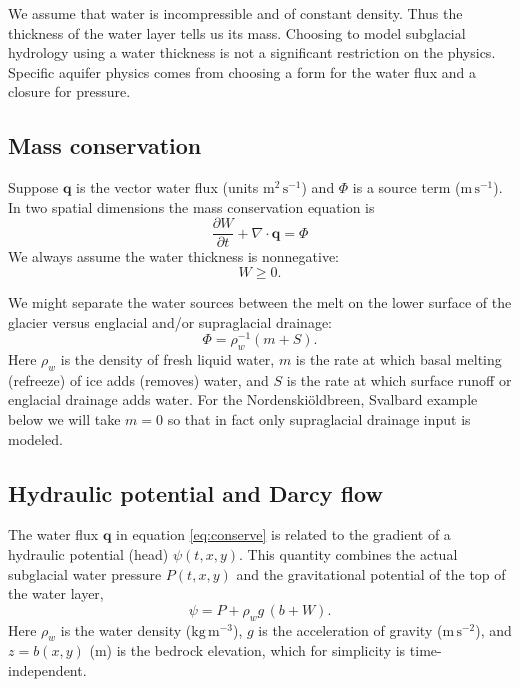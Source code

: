 \documentclass[11pt,final]{amsart}%
\newcommand\bq{\mathbf{q}}
\newcommand{\Div}{\nabla\cdot}
\newcommand{\Nbreen}{Nordenski\"oldbreen\xspace}
\begin{document}
We assume that water is incompressible and of constant density.  Thus the thickness of the water layer tells us its mass.  Choosing to model subglacial hydrology using a water thickness is not a significant restriction on the physics.  Specific aquifer physics comes from choosing a form for the water flux and a closure for pressure.


\subsection*{Mass conservation}  Suppose $\bq$ is the vector water flux (units $\text{m}^2\,\text{s}^{-1}$) and $\Phi$ is a source term ($\text{m}\,\text{s}^{-1}$).  In two spatial dimensions the mass conservation equation is \citep{Clarke05}
\begin{equation} \label{eq:conserve}
\frac{\partial W}{\partial t} + \Div \bq = \Phi
\end{equation}
We always assume the water thickness is nonnegative:
\begin{equation}
W \ge 0.
\end{equation}

We might separate the water sources between the melt on the lower surface of the glacier versus englacial and/or supraglacial drainage:
\begin{equation}
\Phi = \rho_w^{-1} \left(m + S\right).  \label{drainagesplit}
\end{equation}
Here $\rho_w$ is the density of fresh liquid water, $m$ is the rate at which basal melting (refreeze) of ice adds (removes) water, and $S$ is the rate at which surface runoff or englacial drainage adds water.  For the \Nbreen, Svalbard example below we will take $m=0$ so that in fact only supraglacial drainage input is modeled.


\subsection*{Hydraulic potential and Darcy flow}  The water flux $\bq$ in equation \eqref{eq:conserve} is related to the gradient of a hydraulic potential (head) $\psi(t,x,y)$.  This quantity combines the actual subglacial water pressure $P(t,x,y)$ and the gravitational potential of the top of the water layer,
\begin{equation} \label{eq:potential}
\psi = P + \rho_w g\, (b+W).
\end{equation}
Here $\rho_w$ is the water density ($\text{kg}\,\text{m}^{-3}$), $g$ is the acceleration of gravity ($\text{m}\,\text{s}^{-2}$), and $z=b(x,y)$ ($\text{m}$) is the bedrock elevation, which for simplicity is time-independent.
\end{document}
